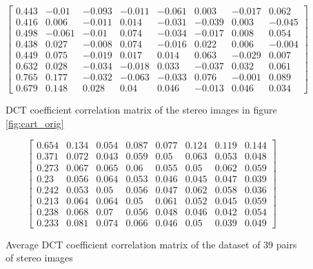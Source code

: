 \begin{figure}
    \begin{equation*}
        \left[
        \begin{matrix}
        0.443 & -0.01  & -0.093 & -0.011 & -0.061 &   0.003 & -0.017 &  0.062 \\
        0.416 &  0.006 & -0.011 &  0.014 & -0.031 &  -0.039 &  0.003 & -0.045 \\
        0.498 & -0.061 & -0.01  &  0.074 & -0.034 &  -0.017 &  0.008 &  0.054 \\
        0.438 &  0.027 & -0.008 &  0.074 & -0.016 &   0.022 &  0.006 & -0.004 \\
        0.449 &  0.075 & -0.019 &  0.017 &  0.014 &   0.063 & -0.029 &  0.007 \\
        0.632 &  0.028 & -0.034 & -0.018 &  0.033 &  -0.037 &  0.032 &  0.061 \\
        0.765 &  0.177 & -0.032 & -0.063 & -0.033 &   0.076 & -0.001 &  0.089 \\
        0.679 &  0.148 &  0.028 &  0.04  &  0.046 &  -0.013 &  0.046 &  0.034
        \end{matrix}
        \right]
    \end{equation*}
    \caption{DCT coefficient correlation matrix of the stereo images in figure \ref{fig:cart_orig} }
\end{figure}

\begin{figure}
    \begin{equation*}
        \left[
        \begin{matrix}
        0.654 & 0.134 & 0.054 & 0.087 & 0.077 & 0.124 & 0.119 & 0.144 \\
        0.371 & 0.072 & 0.043 & 0.059 & 0.05  & 0.063 & 0.053 & 0.048 \\
        0.273 & 0.067 & 0.065 & 0.06  & 0.055 & 0.05  & 0.062 & 0.059 \\
        0.23  & 0.056 & 0.064 & 0.053 & 0.046 & 0.045 & 0.047 & 0.039 \\
        0.242 & 0.053 & 0.05  & 0.056 & 0.047 & 0.062 & 0.058 & 0.036 \\
        0.213 & 0.064 & 0.064 & 0.05  & 0.061 & 0.052 & 0.045 & 0.059 \\
        0.238 & 0.068 & 0.07  & 0.056 & 0.048 & 0.046 & 0.042 & 0.054 \\
        0.233 & 0.081 & 0.074 & 0.066 & 0.046 & 0.05  & 0.039 & 0.049
        \end{matrix}
        \right]
    \end{equation*}
    \caption{Average DCT coefficient correlation matrix of the dataset of 39 pairs of stereo images}
\end{figure}

